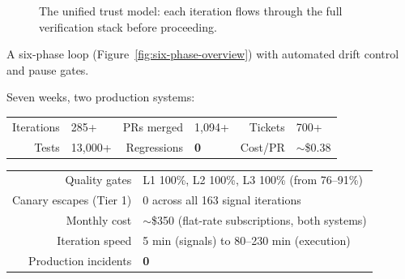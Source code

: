 \documentclass[11pt,a4paper]{article}
\begin{document}
\begin{figure}[H]
\caption{The unified trust model: each iteration flows through the full verification stack before proceeding.}
\label{fig:trust-model-overview}
\end{figure}

\begin{description}[style=nextline, leftmargin=1.5em, font=\bfseries]
\item[The architecture] A six-phase loop (Figure~\ref{fig:six-phase-overview}) with automated drift control and pause gates.

\item[The results] Seven weeks, two production systems:
\end{description}

\begin{tcolorbox}[resultbox, title=Kitchen Loop Results]
\centering
\renewcommand{\arraystretch}{1.3}
\begin{tabular}{@{}r@{\;=\;}l@{\qquad}r@{\;=\;}l@{\qquad}r@{\;=\;}l@{}}
Iterations & 285+ & PRs merged & 1{,}094+ & Tickets & 700+ \\
Tests & 13{,}000+ & Regressions & \textbf{0} & Cost/PR & ${\sim}$\$0.38 \\
\end{tabular}

\vspace{6pt}
\begin{tabular}{@{}r@{\quad}l@{}}
\toprule
Quality gates & L1 100\%, L2 100\%, L3 100\% (from 76--91\%) \\
Canary escapes (Tier 1) & 0 across all 163 signal iterations \\
Monthly cost & ${\sim}$\$350 (flat-rate subscriptions, both systems) \\
Iteration speed & 5 min (signals) to 80--230 min (execution) \\
Production incidents & \textbf{0} \\
\bottomrule
\end{tabular}
\end{tcolorbox}
\end{document}
